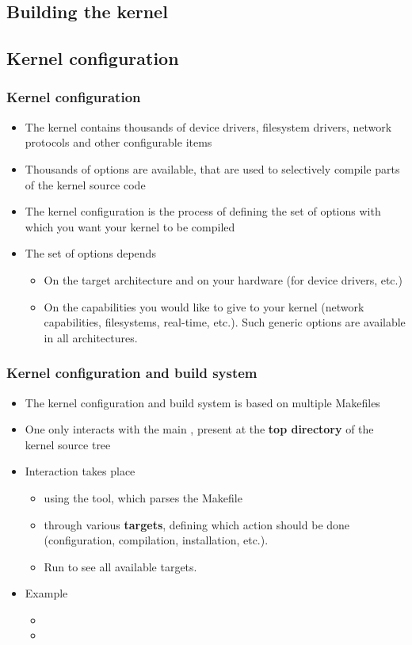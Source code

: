 \subsection{Building the kernel}

\subsection{Kernel configuration}

\begin{frame}
  \frametitle{Kernel configuration}
  \begin{itemize}
  \item The kernel contains thousands of device drivers, filesystem
    drivers, network protocols and other configurable items
  \item Thousands of options are available, that are used to
    selectively compile parts of the kernel source code
  \item The kernel configuration is the process of defining the set of
    options with which you want your kernel to be compiled
  \item The set of options depends
    \begin{itemize}
    \item On the target architecture and on your hardware (for device drivers, etc.)
    \item On the capabilities you would like to give to your kernel
      (network capabilities, filesystems, real-time, etc.).
      Such generic options are available in all architectures.
    \end{itemize}
  \end{itemize}
\end{frame}

\begin{frame}
  \frametitle{Kernel configuration and build system}
  \begin{itemize}
  \item The kernel configuration and build system is based on multiple
    Makefiles
  \item One only interacts with the main , present at
    the {\bf top directory} of the kernel source tree
  \item Interaction takes place
    \begin{itemize}
    \item using the  tool, which parses the Makefile
    \item through various {\bf targets}, defining which action should
      be done (configuration, compilation, installation, etc.).
    \item Run  to see all available targets.
    \end{itemize}
  \item Example
    \begin{itemize}
    \item {}
    \item {}
    \end{itemize}
  \end{itemize}
\end{frame}

